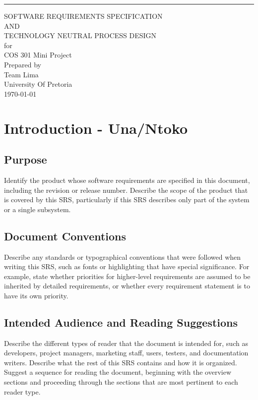 \documentclass{scrreprt}
\date{}
\begin{document}
\begin{flushright}
    \rule{16cm}{5pt}\vskip1cm
    \begin{bfseries}
        \Huge{SOFTWARE REQUIREMENTS SPECIFICATION \\ AND \\ TECHNOLOGY NEUTRAL PROCESS DESIGN}\\
        \vspace{1cm}
        for\\
        \vspace{1cm}
        COS 301 Mini Project\\
        \vspace{1cm}
        Prepared by \\ Team Lima\\
        \vspace{1cm}
        University Of Pretoria\\
        \vspace{1cm}
        \today\\
    \end{bfseries}
\end{flushright}

\tableofcontents


\chapter{Introduction - Una/Ntoko}


\section{Purpose}
Identify the product whose software requirements are specified in this 
document, including the revision or release number. Describe the scope of the 
product that is covered by this SRS, particularly if this SRS describes only 
part of the system or a single subsystem.

\section{Document Conventions}
Describe any standards or typographical conventions that were followed when 
writing this SRS, such as fonts or highlighting that have special significance.  
For example, state whether priorities  for higher-level requirements are assumed 
to be inherited by detailed requirements, or whether every requirement statement 
is to have its own priority.

\section{Intended Audience and Reading Suggestions}
Describe the different types of reader that the document is intended for, 
such as developers, project managers, marketing staff, users, testers, and 
documentation writers. Describe what the rest of this SRS contains and how it is 
organized. Suggest a sequence for reading the document, beginning with the 
overview sections and proceeding through the sections that are most pertinent to 
each reader type.
\end{document}

